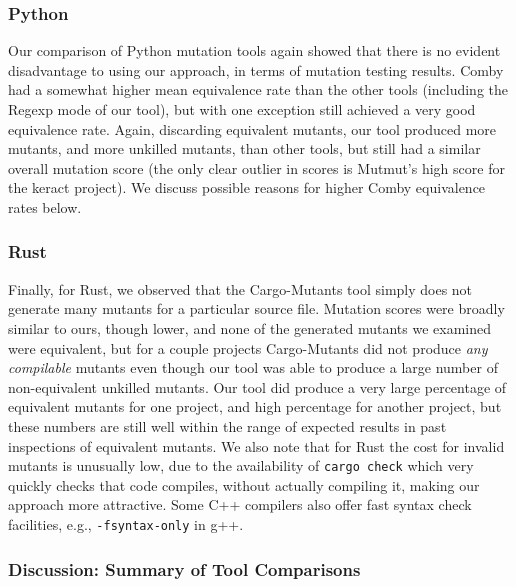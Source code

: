 \documentclass[acmsmall,screen,review,anonymous]{acmart}
\begin{document}
{\subsubsection{Python}

Our comparison of Python mutation tools again showed that there is no
evident disadvantage to
using our approach, in terms of mutation testing results.  Comby had a somewhat higher mean equivalence rate than the
other tools (including the Regexp mode of our tool), but with one
exception still achieved a very good equivalence rate.  Again, discarding
equivalent mutants, our tool produced more mutants, and more unkilled
mutants, than other tools, but still had a similar overall mutation
score (the only clear outlier in scores is Mutmut's high score for the
keract project).  We discuss
possible reasons for higher Comby equivalence rates below.

\subsubsection{Rust}

Finally, for Rust, we observed that the Cargo-Mutants tool simply does
not generate many mutants for a particular source file.  Mutation scores were broadly similar to
ours, though lower, and none of the generated mutants we examined were
equivalent, but for a couple projects Cargo-Mutants did not produce
\emph{any compilable} mutants even though our tool was able to produce a large
number of non-equivalent unkilled mutants.  Our tool did produce a
very large percentage of equivalent mutants for one project, and high
percentage for another project, but these numbers are still well
within the range of expected results in past inspections of
equivalent mutants.  We also note  that for Rust the cost for invalid
mutants is unusually low, due to the availability of {\tt cargo check}
which very quickly checks that code compiles, without actually
compiling it, making our approach more attractive.  Some C++ compilers
also offer fast syntax check facilities, e.g., {\tt -fsyntax-only} in g++.

\subsubsection{Discussion: Summary of Tool Comparisons}

}
\end{document}
